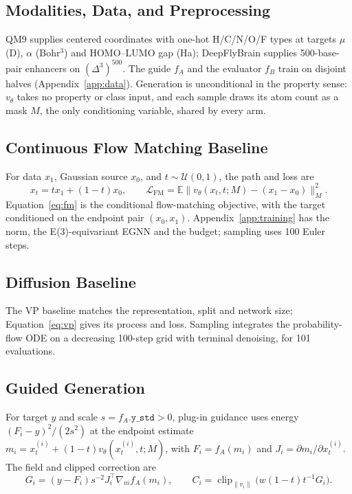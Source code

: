 \documentclass{article}
\begin{document}
\subsection{Modalities, Data, and Preprocessing}\label{sec:data}
QM9 \citep{ramakrishnan2014qm9} supplies centered coordinates with one-hot H/C/N/O/F types at targets $\mu$ (D), $\alpha$ (Bohr$^3$) and HOMO--LUMO gap (Ha); DeepFlyBrain \citep{stark2024dirichlet} supplies 500-base-pair enhancers on $(\Delta^3)^{500}$. The guide $f_A$ and the evaluator $f_B$ train on disjoint halves (Appendix~\ref{app:data}). Generation is unconditional in the property sense: $v_\theta$ takes no property or class input, and each sample draws its atom count as a mask $M$, the only conditioning variable, shared by every arm.

\subsection{Continuous Flow Matching Baseline}\label{sec:fm}
For data $x_1$, Gaussian source $x_0$, and $t\sim\mathcal U(0,1)$, the path and loss are
\begin{equation}
x_t=t x_1+(1-t)x_0,\qquad
\mathcal L_{\mathrm{FM}}=\mathbb E\|v_\theta(x_t,t;M)-(x_1-x_0)\|_M^2.
\label{eq:fm}
\end{equation}
Equation~\eqref{eq:fm} is the conditional flow-matching objective, with the target conditioned on the endpoint pair $(x_0,x_1)$. Appendix~\ref{app:training} has the norm, the E(3)-equivariant EGNN and the budget; sampling uses 100 Euler steps.

\subsection{Diffusion Baseline}\label{sec:diff}
The VP baseline matches the representation, split and network size; Equation~\eqref{eq:vp} gives its process and loss. Sampling integrates the probability-flow ODE on a decreasing 100-step grid with terminal denoising, for 101 evaluations.

\subsection{Guided Generation}\label{sec:guidance}
For target $y$ and scale $s=f_A.\texttt{y\_std}>0$, plug-in guidance uses energy $(F_i-y)^2/(2s^2)$ at the endpoint estimate $m_i=x_t^{(i)}+(1-t)v_\theta(x_t^{(i)},t;M)$, with $F_i=f_A(m_i)$ and $J_i=\partial m_i/\partial x_t^{(i)}$. The field and clipped correction are
\begin{equation}
G_i=(y-F_i)s^{-2}J_i^\top\nabla_m f_A(m_i),\qquad
C_i=\operatorname{clip}_{\|v_i\|}\big(w(1-t)t^{-1}G_i\big).
\label{eq:plug}
\end{equation}
\end{document}
